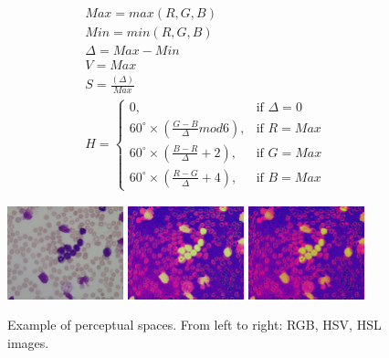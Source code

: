 \documentclass[final,a4paper,12pt,english]{UnicaPhdThesis3}
\begin{document}
\begin{equation}\label{HSV}
\begin{split}
&Max = max(R, G, B)\\
&Min = min(R, G, B)\\
&\Delta = Max-Min\\
&V = Max\\
&S = \frac{(\Delta)}{Max}\\
&H = \begin{cases} 0, & \mbox{if   } \Delta = 0 \\ 60^\circ \times \left (\frac{G-B}{\Delta} mod6 \right ), & \mbox{if   } R = Max \\  
60^\circ \times \left ( \frac{B-R}{\Delta} + 2 \right ), & \mbox{if   } G = Max\\ 
60^\circ \times \left ( \frac{R-G}{\Delta} + 4 \right ), & \mbox{if   } B = Max\end{cases} 
\end{split}
\end{equation}

\begin{figure}[ht]
	\includegraphics[width=0.3\textwidth]{images/figcs_rgb}
	\includegraphics[width=0.3\textwidth]{images/figcs_hsv}
	\includegraphics[width=0.3\textwidth]{images/figcs_hsl}
	\caption{\label{fig:colour_spaces_per}Example of perceptual spaces. From left to right: RGB, HSV, HSL images.}
\end{figure}
\end{document}
